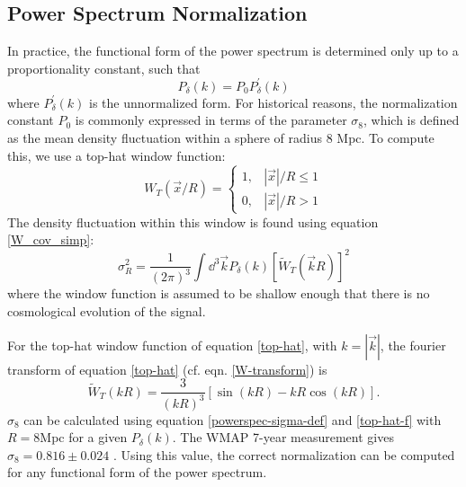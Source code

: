\subsection{Power Spectrum Normalization}
In practice, the functional form of the power spectrum is determined only
up to a proportionality constant, such that
\begin{equation}
  P_\delta(k) = P_0 P^\prime_\delta(k)
\end{equation}
where $P^\prime_\delta(k)$ is the unnormalized form.
For historical reasons, the normalization constant $P_0$ is commonly 
expressed in terms of the parameter $\sigma_8$, 
which is defined as the mean density 
fluctuation within a sphere of radius 8 Mpc.  To compute this, we use a 
top-hat window function:
\begin{equation}
\label{top-hat}
  W_T(\vec{x}/R) = \left\{
    \begin{array}{ll}
      1, & |\vec x|/R \le 1 \\
      0, & |\vec x|/R > 1
    \end{array}
    \right.
\end{equation} 
The density fluctuation within this window is found using equation \ref{W_cov_simp}:
\begin{equation}
  \label{powerspec-sigma-def}
  \sigma_R^2 = \frac{1}{(2\pi)^3}\int \dd^3\vec{k} 
  P_\delta(k) [\widetilde{W}_T(\vec{k}R)]^2
\end{equation}
where the window function is assumed to be shallow enough that there is no
cosmological evolution of the signal.

For the top-hat window function of equation \ref{top-hat}, with 
$k = |\vec{k}|$,
the fourier transform of equation \ref{top-hat} (cf. eqn. \ref{W-transform}) is
\begin{equation}
  \label{top-hat-f}
  \widetilde{W}_T(kR) = \frac{3}{(kR)^3}\left[\sin(kR) - kR\cos(kR) \right].
\end{equation}
$\sigma_8$ can be calculated using equation \ref{powerspec-sigma-def}
and \ref{top-hat-f} with $R=8$Mpc for a given $P_\delta(k)$. 
The WMAP 7-year measurement gives $\sigma_8 = 0.816 \pm 0.024$ 
\citep{WMAP7}.  Using this value, the correct normalization 
can be computed for any functional form of the power spectrum.

